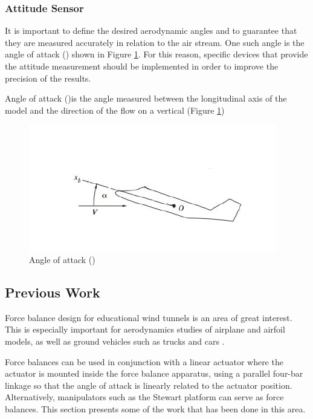 \subsubsection{Attitude Sensor}
It is important to define the desired aerodynamic angles and to guarantee that they are measured accurately in relation to the air stream. One such angle is the angle of attack (\textalpha) shown in Figure \ref{att}. For this reason, specific devices that provide the attitude measurement should be implemented in order to improve the precision of the results.

Angle of attack (\textalpha)is the angle measured between the longitudinal axis of the model and the direction of the flow on a vertical (Figure \ref{att})
\begin{center}
	\begin{figure}[H]
	\centering
	\includegraphics[width=0.6\linewidth]{Figures/Fig10}
	\caption[Angle of attack]{Angle of attack (\textalpha) \cite{ferreira2015design}}
	\label{att}
	\end{figure}
\end{center}
\subsection{Previous Work}
Force balance design for educational wind tunnels is an area of great interest. This is especially important
for aerodynamics studies of airplane and airfoil models, as well as ground vehicles such as trucks
and cars \cite{morris_force_2010}.

Force balances can be used in conjunction with a linear actuator where the
actuator is mounted inside the force balance apparatus, using a parallel four-bar linkage so that
the angle of attack is linearly related to the actuator position. Alternatively, manipulators such as the Stewart platform can serve as force balances. This section presents some of the work that has been done in this area.
